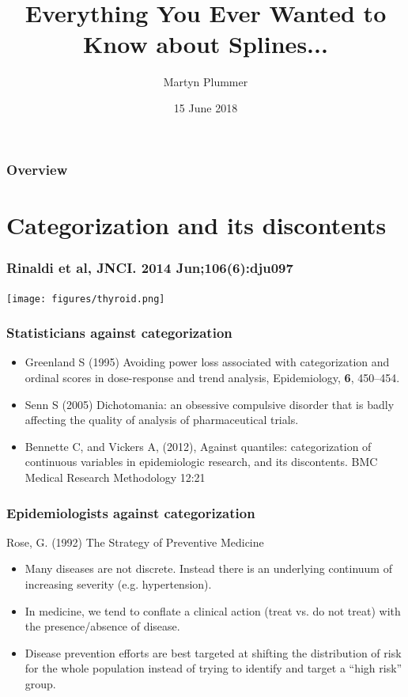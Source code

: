 \documentclass{beamer}
\title{~ \\ ~ \\ ~ \\ Everything You Ever Wanted to Know about Splines...}
\author{Martyn Plummer}
\institute[IARC] %
{
  Infection and Cancer Epidemiology Group, IARC
}
\date[IARC]{15 June 2018}
\begin{document}
\begin{frame}[plain]
  \titlepage
\end{frame}

\begin{frame}
  \frametitle{Overview}
  \tableofcontents
\end{frame}

\section{Categorization and its discontents}

\begin{frame}
  \frametitle{Rinaldi et al, JNCI. 2014 Jun;106(6):dju097}

  \begin{center}
  \texttt{[image: figures/thyroid.png]}
  \end{center}
  
\end{frame}

\begin{frame}
  \frametitle{Statisticians against categorization}
  \begin{itemize}
  \item Greenland S (1995) Avoiding power loss associated with
    categorization and ordinal scores in dose-response and trend
    analysis, Epidemiology, {\bf 6}, 450--454.
  \item Senn S (2005) Dichotomania: an obsessive compulsive disorder
    that is badly affecting the quality of analysis of pharmaceutical trials.
  \item Bennette C, and Vickers A, (2012), Against quantiles:
    categorization of continuous variables in epidemiologic research,
    and its discontents. BMC Medical Research Methodology 12:21
  \end{itemize}
\end{frame}

\begin{frame}
  \frametitle{Epidemiologists against categorization}

  Rose, G. (1992) The Strategy of Preventive Medicine
  \begin{itemize}
  \item Many diseases are not discrete. Instead there is an underlying
    continuum of increasing severity (e.g. hypertension).
  \item In medicine, we tend to conflate a clinical action (treat
    vs. do not treat) with the presence/absence of disease.
  \item Disease prevention efforts are best targeted at shifting the
    distribution of risk for the whole population instead of trying to
    identify and target a ``high risk'' group.
  \end{itemize}

\end{frame}
 
\end{document}
